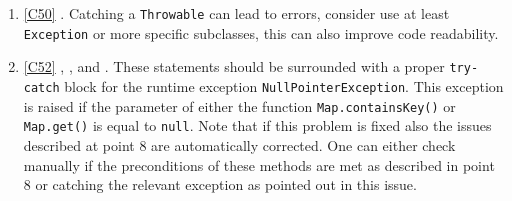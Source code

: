 \begin{enumerate}
	\item \ref{C50} . Catching a \texttt{Throwable} can lead to errors, consider use at least \texttt{Exception} or more specific subclasses, this can also improve code readability.  
	\item \ref{C52} , ,  and . These statements should be surrounded with a proper \texttt{try-catch} block for the runtime exception \texttt{NullPointerException}. This exception is raised if the parameter of either the function \texttt{Map.containsKey()} or \texttt{Map.get()} is equal to \texttt{null}. Note that if this problem is fixed also the issues described at point 8 are automatically corrected. One can either check manually if the preconditions of these methods are met as described in point 8 or catching the relevant exception as pointed out in this issue.
\end{enumerate}


